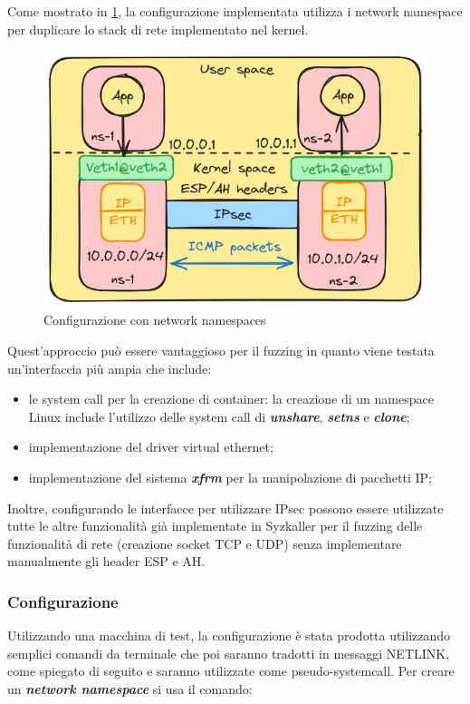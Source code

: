 \documentclass{article}
\begin{document}
Come mostrato in \cref{fig:netns-config}, la  
configurazione implementata utilizza i network namespace per duplicare lo stack di rete 
implementato nel kernel.
\begin{figure}[h]
  \begin{center}
    \includegraphics[width=.7\textwidth]{figures/netns-solution.png}
  \end{center}
  \caption{Configurazione con network namespaces}\label{fig:netns-config}
\end{figure}
Quest'approccio può essere vantaggioso per il fuzzing in quanto viene testata un'interfaccia più ampia che include:
\begin{itemize}
  \item le system call per la creazione di container: la creazione di un namespace Linux 
    include l'utilizzo delle system call di \textbf{\textit{unshare}}, \textbf{\textit{setns}} e 
    \textbf{\textit{clone}};
  \item implementazione del driver virtual ethernet;
  \item implementazione del sistema \textbf{\textit{xfrm}} per la manipolazione di pacchetti 
    IP;
\end{itemize}

Inoltre, configurando le interfacce per utilizzare IPsec possono essere utilizzate 
tutte le altre funzionalità già implementate in Syzkaller per il fuzzing delle funzionalità 
di rete (creazione socket TCP e UDP) senza implementare manualmente gli header ESP e AH.

\subsubsection{Configurazione}
Utilizzando una macchina di test, la configurazione è stata prodotta utilizzando semplici 
comandi da terminale che poi saranno tradotti in messaggi NETLINK, come spiegato di 
seguito e saranno utilizzate come pseudo-systemcall. Per creare un \textbf{\textit{network 
namespace}} si usa il comando:
\end{document}

